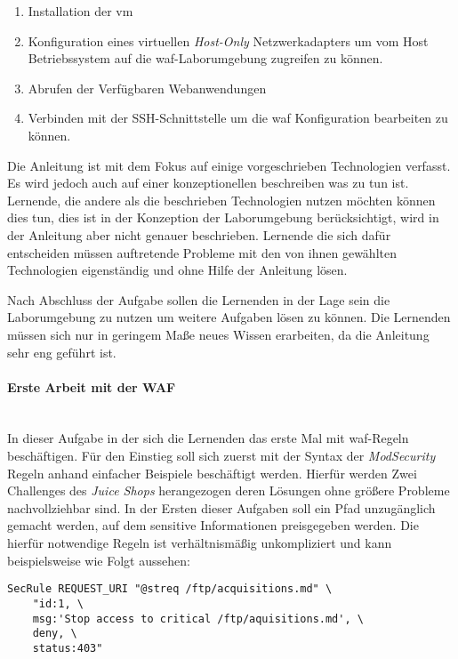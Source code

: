 \begin{enumerate}
    \item Installation der \ac{vm}
    \item Konfiguration eines virtuellen \textit{Host-Only} Netzwerkadapters um vom Host Betriebssystem auf die \ac{waf}-Laborumgebung zugreifen zu können.
    \item Abrufen der Verfügbaren Webanwendungen
    \item Verbinden mit der SSH-Schnittstelle um die \ac{waf} Konfiguration bearbeiten zu können.
\end{enumerate}

Die Anleitung ist mit dem Fokus auf einige vorgeschrieben Technologien verfasst.
Es wird jedoch auch auf einer konzeptionellen beschreiben was zu tun ist.
Lernende, die andere als die beschrieben Technologien nutzen möchten können dies tun, dies ist in der Konzeption der Laborumgebung berücksichtigt, wird in der Anleitung aber nicht genauer beschrieben.
Lernende die sich dafür entscheiden müssen auftretende Probleme mit den von ihnen gewählten Technologien eigenständig und ohne Hilfe der Anleitung lösen.

Nach Abschluss der Aufgabe sollen die Lernenden in der Lage sein die Laborumgebung zu nutzen um weitere Aufgaben lösen zu können.
Die Lernenden müssen sich nur in geringem Maße neues Wissen erarbeiten, da die Anleitung sehr eng geführt ist.

\paragraph{Erste Arbeit mit der WAF}\ \\

In dieser Aufgabe in der sich die Lernenden das erste Mal mit \ac{waf}-Regeln beschäftigen.
Für den Einstieg soll sich zuerst mit der Syntax der \textit{ModSecurity} Regeln anhand einfacher Beispiele beschäftigt werden.
Hierfür werden Zwei Challenges des \textit{Juice Shops} herangezogen deren Lösungen ohne größere Probleme nachvollziehbar sind.
In der Ersten dieser Aufgaben soll ein Pfad unzugänglich gemacht werden, auf dem sensitive Informationen preisgegeben werden.
Die hierfür notwendige Regeln ist verhältnismäßig unkompliziert und kann beispielsweise wie Folgt aussehen:

\begin{verbatim}
SecRule REQUEST_URI "@streq /ftp/acquisitions.md" \
    "id:1, \
    msg:'Stop access to critical /ftp/aquisitions.md', \
    deny, \
    status:403"
\end{verbatim}

